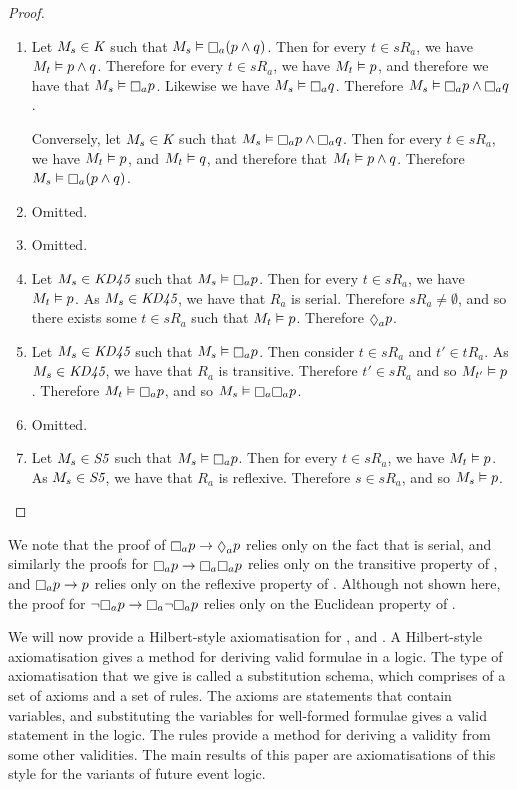 \begin{proof}
\begin{enumerate}
\item Let $M_s \in \textit{K}{}$ such that $M_s \entails \knows_a (p \land q)$.
Then for every $t \in sR_a$, we have $M_t \vDash p \land q$. Therefore for every $t
\in sR_a$, we have $M_t \vDash p$, and therefore we have that $M_s \entails
\knows_a p$. Likewise we have $M_s \entails \knows_a q$. Therefore $M_s \entails
\knows_a p \land \knows_a q$.

Conversely, let $M_s \in \textit{K}{}$ such that $M_s \entails \knows_a p \land
\knows_a q$. Then for every $t \in sR_a$, we have $M_t \vDash p$, and $M_t
\vDash q$, and therefore that $M_t \vDash p \land q$. Therefore $M_s
\entails \knows_a (p \land q)$.
\item Omitted.
\item Omitted.
\item Let $M_s \in \textit{KD45}{}$ such that $M_s \entails \knows_a p$. Then for
every $t \in sR_a$, we have $M_t \vDash p$. As $M_s \in \textit{KD45}{}$, we have
that $R_a$ is serial. Therefore $sR_a \neq \emptyset$, and so there exists some
$t \in sR_a$ such that $M_t \vDash p$. Therefore $\suspects_a p$.
\item Let $M_s \in \textit{KD45}{}$ such that $M_s \entails \knows_a p$. Then
consider $t \in sR_a$ and $t' \in tR_a$. As $M_s \in \textit{KD45}{}$, we have that
$R_a$ is transitive. Therefore $t' \in sR_a$ and so $M_{t'} \vDash p$.
Therefore $M_t \entails \knows_a p$, and so $M_s \entails \knows_a \knows_a p$. 
\item Omitted.
\item Let $M_s \in \textit{S5}{}$ such that $M_s \entails \knows_a p$. Then for
every $t \in sR_a$, we have $M_t \vDash p$. As $M_s \in \textit{S5}{}$, we have
that $R_a$ is reflexive. Therefore $s \in sR_a$, and so $M_s \vDash p$.
\end{enumerate}
\end{proof}

We note that the proof of $\knows_a p \implies \suspects_a p$ relies only on the
fact that \classKD{} is serial, and similarly the proofs for $\knows_a p
\implies \knows_a \knows_a p$ relies only on the transitive property of
\classKD{}, and $\knows_a p \implies p$ relies only on the reflexive property of
\classS{}. Although not shown here, the proof for $\neg \knows_a p \implies
\knows_a \neg \knows_a p$ relies only on the Euclidean property of \classKD{}.

We will now provide a Hilbert-style axiomatisation for \logicK{}, \logicKD{} and
\logicS{}. A Hilbert-style axiomatisation gives a method for deriving valid
formulae in a logic. The type of axiomatisation that we give is called a
substitution schema, which comprises of a set of axioms and a set of rules. The
axioms are statements that contain variables, and substituting the variables for
well-formed formulae gives a valid statement in the logic. The rules provide a
method for deriving a validity from some other validities. The main results of
this paper are axiomatisations of this style for the variants of future event
logic.

